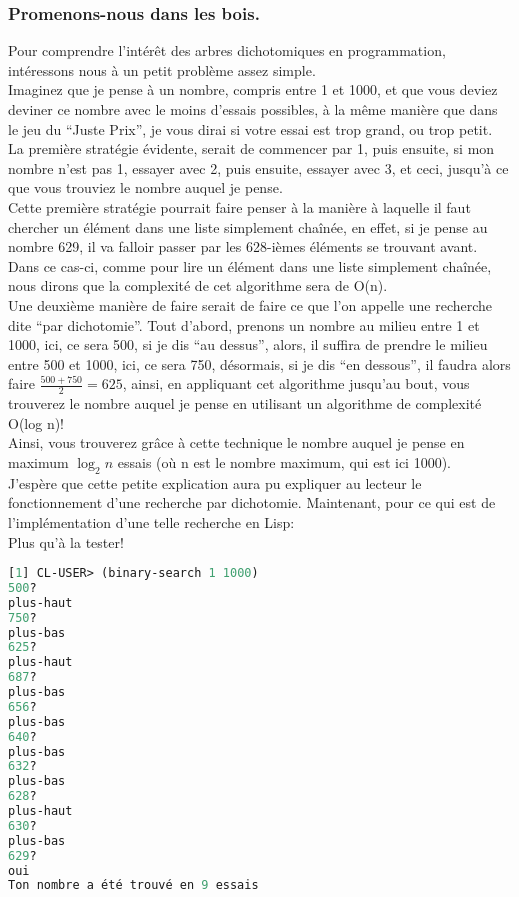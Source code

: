 \documentclass[a4paper, 12pt]{article}
\numberwithin{equation}{subsection}
\begin{document}
\subsubsection{Promenons-nous dans les bois.}
Pour comprendre l'intérêt des arbres dichotomiques en programmation, intéressons nous à un petit problème assez simple. \\
Imaginez que je pense à un nombre, compris entre 1 et 1000, et que vous deviez deviner ce nombre avec le moins d'essais possibles, à la même manière que dans le jeu du ``Juste Prix'', je vous dirai si votre essai est trop grand, ou trop petit. \\
La première stratégie évidente, serait de commencer par 1, puis ensuite, si mon nombre n'est pas 1, essayer avec 2, puis ensuite, essayer avec 3, et ceci, jusqu'à ce que vous trouviez le nombre auquel je pense. \\
Cette première stratégie pourrait faire penser à la manière à laquelle il faut chercher un élément dans une liste simplement chaînée, en effet, si je pense au nombre 629, il va falloir passer par les 628-ièmes éléments se trouvant avant. Dans ce cas-ci, comme pour lire un élément dans une liste simplement chaînée, nous dirons que la complexité de cet algorithme sera de O(n). \\
Une deuxième manière de faire serait de faire ce que l'on appelle une recherche dite ``par dichotomie''. Tout d'abord, prenons un nombre au milieu entre 1 et 1000, ici, ce sera 500, si je dis ``au dessus'', alors, il suffira de prendre le milieu entre 500 et 1000, ici, ce sera 750, désormais, si je dis ``en dessous'', il faudra alors faire $\frac{500 + 750}{2} = 625$, ainsi, en appliquant cet algorithme jusqu'au bout, vous trouverez le nombre auquel je pense en utilisant un algorithme de complexité O(log n)! \\ Ainsi, vous trouverez grâce à cette technique le nombre auquel je pense en maximum $\log_{2}{n}$ essais (où n est le nombre maximum, qui est ici 1000). \\
J'espère que cette petite explication aura pu expliquer au lecteur le fonctionnement d'une recherche par dichotomie. Maintenant, pour ce qui est de l'implémentation d'une telle recherche en Lisp: \\

Plus qu'à la tester!
\begin{lstlisting}[language=Lisp]
[1] CL-USER> (binary-search 1 1000)
500?
plus-haut
750?
plus-bas
625?
plus-haut
687?
plus-bas
656?
plus-bas
640?
plus-bas
632?
plus-bas
628?
plus-haut
630?
plus-bas
629?
oui
Ton nombre a été trouvé en 9 essais
\end{lstlisting}
\end{document}
